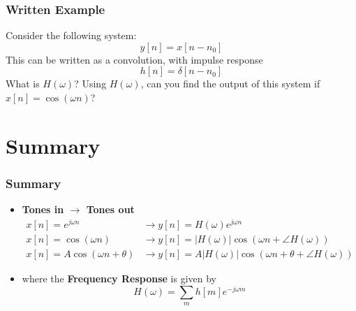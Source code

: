 \documentclass{beamer}
\begin{document}
\begin{frame}
  \frametitle{Written Example}
  Consider the following system:
  \[
  y[n] = x[n-n_0]
  \]
  This can be written as a convolution, with impulse response
  \[
  h[n] = \delta[n-n_0]
  \]
  What is $H(\omega)$?  Using $H(\omega)$, can you find the output of this system if
  $x[n]=\cos(\omega n)$?
\end{frame}


\section[Summary]{Summary}
\setcounter{subsection}{1}

\begin{frame}
  \frametitle{Summary}
  \begin{itemize}
  \item {\bf Tones in $\rightarrow$ Tones out}
    \begin{align*}
      x[n]=e^{j\omega n} &\rightarrow y[n]=H(\omega)e^{j\omega n}\\
      x[n]=\cos\left(\omega n\right)
      &\rightarrow y[n]=|H(\omega)|\cos\left(\omega n+\angle H(\omega)\right)\\
      x[n]=A\cos\left(\omega n+\theta\right)
      &\rightarrow y[n]=A|H(\omega)|\cos\left(\omega n+\theta+\angle H(\omega)\right)
    \end{align*}
  \item where the {\bf Frequency Response} is given by
    \[
    H(\omega) = \sum_m h[m]e^{-j\omega m}
    \]
  \end{itemize}
\end{frame}  
        
\end{document}
